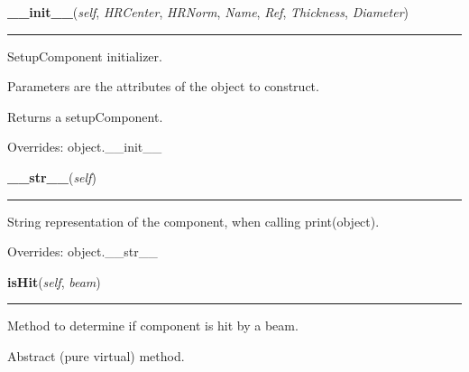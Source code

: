 \hspace{.8\funcindent}\begin{boxedminipage}{\funcwidth}

    \raggedright \textbf{\_\_init\_\_}(\textit{self}, \textit{HRCenter}, \textit{HRNorm}, \textit{Name}, \textit{Ref}, \textit{Thickness}, \textit{Diameter})

    \vspace{-1.5ex}

    \rule{\textwidth}{0.5\fboxrule}
\setlength{\parskip}{2ex}
    SetupComponent initializer.

    Parameters are the attributes of the object to construct.

    Returns a setupComponent.

\setlength{\parskip}{1ex}
      Overrides: object.\_\_init\_\_

    \end{boxedminipage}

    \vspace{0.5ex}

\hspace{.8\funcindent}\begin{boxedminipage}{\funcwidth}

    \raggedright \textbf{\_\_str\_\_}(\textit{self})

    \vspace{-1.5ex}

    \rule{\textwidth}{0.5\fboxrule}
\setlength{\parskip}{2ex}
    String representation of the component, when calling print(object).

\setlength{\parskip}{1ex}
      Overrides: object.\_\_str\_\_

    \end{boxedminipage}

    \label{theia:optics:component:SetupComponent:isHit}

    \vspace{0.5ex}

\hspace{.8\funcindent}\begin{boxedminipage}{\funcwidth}

    \raggedright \textbf{isHit}(\textit{self}, \textit{beam})

    \vspace{-1.5ex}

    \rule{\textwidth}{0.5\fboxrule}
\setlength{\parskip}{2ex}
    Method to determine if component is hit by a beam.

    Abstract (pure virtual) method.

\setlength{\parskip}{1ex}
    \end{boxedminipage}

